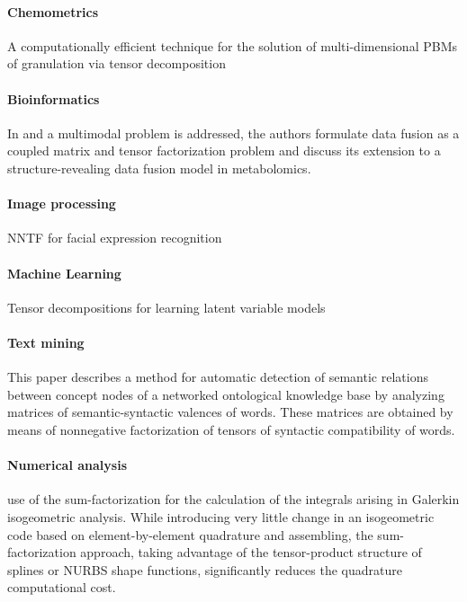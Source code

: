 \documentclass[letterpaper,12pt]{article}
\begin{document}
\paragraph{Chemometrics}

\cite{Chaudhury2014} A computationally efficient technique for the solution of multi-dimensional PBMs of granulation via tensor decomposition

\paragraph{Bioinformatics}

In \cite{Acar2015} and \cite{Acar2014} a multimodal problem is addressed, the authors formulate data fusion as a coupled matrix and tensor factorization problem and discuss its extension to a structure-revealing data fusion model in metabolomics.


\paragraph{Image processing}

\cite{An2015} NNTF for facial expression recognition


\paragraph{Machine Learning}

\cite{Anandkumar2012} Tensor decompositions for learning latent variable models

\paragraph{Text mining}

\cite{Anisimov2014} This paper describes a method for automatic detection of semantic relations between concept nodes of a networked ontological knowledge base by analyzing matrices of semantic-syntactic valences of words. These matrices are obtained by means of nonnegative factorization of tensors of syntactic compatibility of words. 


\paragraph{Numerical analysis}
 
\cite{Antolin2015} use of the sum-factorization for the calculation of the integrals arising in Galerkin isogeometric analysis. While introducing very little change in an isogeometric code based on element-by-element quadrature and assembling, the sum-factorization approach, taking advantage of the tensor-product structure of splines or NURBS shape functions, significantly reduces the quadrature computational cost.
\end{document}
